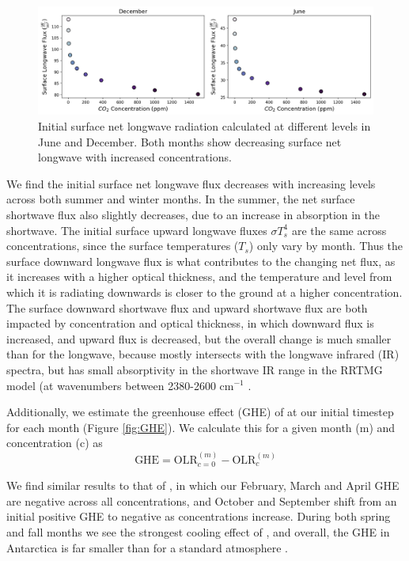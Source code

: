 \documentclass[12]{article}
\begin{document}
\begin{figure}[htb!]
\noindent\includegraphics[width=1\textwidth]{figures/sfcLW_init.png}
\centering
\caption{Initial surface net longwave radiation calculated at different  levels in June and December. Both months show decreasing surface net longwave with increased  concentrations.}
\label{fig:init_sfc_LW}
\end{figure}

We find the initial surface net longwave flux decreases with increasing  levels across both summer and winter months. In the summer, the net surface shortwave flux also slightly decreases, due to an increase in  absorption in the shortwave.  The initial surface upward longwave fluxes $\sigma T_s^4$ are the same across  concentrations, since the surface temperatures ($T_s$) only vary by month. Thus the surface downward longwave flux is what contributes to the changing net flux, as it increases with a higher optical thickness, and the temperature and level from which it is radiating downwards is closer to the ground at a higher  concentration. The surface downward shortwave flux and upward shortwave flux are both impacted by  concentration and optical thickness, in which downward flux is increased, and upward flux is decreased, but the overall change is much smaller than for the longwave, because  mostly intersects with the longwave infrared (IR) spectra, but has small absorptivity in the shortwave IR range in the RRTMG model (at wavenumbers between 2380-2600 cm$^{-1}$ \citep{mlawer_radiative_1997}. 

Additionally, we estimate the greenhouse effect (GHE) of  at our initial timestep for each month (Figure \ref{fig:GHE}). We calculate this for a given month (m) and  concentration (c) as
\begin{equation}
    \text{GHE} = \text{OLR}_{c=0}^{(m)} - \text{OLR}_{c}^{(m)}
\end{equation}

We find similar results to that of \citep{schmithusen_how_2015}, in which our February, March and April GHE are negative across all  concentrations, and October and September shift from an initial positive GHE to negative as concentrations increase. During both spring and fall months we see the strongest cooling effect of , and overall, the GHE in Antarctica is far smaller than for a standard atmosphere \citep{schmithusen_how_2015}.
\end{document}
